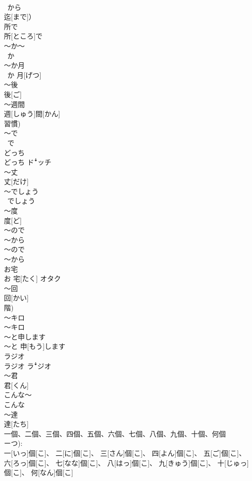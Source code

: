 \documentclass[8pt]{extreport}
\begin{document}
\begin{CJK}{UTF8}{min}
\\	~から　
\\	迄[まで]）	
\\	所で	
\\	所[ところ]で	
\\	～か～	
\\	~か~	
\\	～か月	
\\	~か 月[げつ]	
\\	～後	
\\	後[ご]	
\\	～週間	
\\	週[しゅう]間[かん] 
\\	習慣)	
\\	～で	
\\	~で	
\\	どっち	
\\	どっち	ドꜜッチ
\\	～丈	
\\	丈[だけ]	
\\	～でしょう	
\\	~でしょう	
\\	～度	
\\	度[ど]	
\\	～ので 
\\	～から	
\\	～ので 
\\	～から	
\\	お宅	
\\	お 宅[たく]	オタク
\\	～回	
\\	回[かい] 
\\	階)	
\\	～キロ	
\\	～キロ	
\\	～と申します	
\\	～と 申[もう]します	
\\	ラジオ	
\\	ラジオ	ラꜜジオ
\\	～君	
\\	君[くん]	
\\	こんな～	
\\	こんな~	
\\	～達	
\\	達[たち]	
\\	一個、二個、三個、四個、五個、六個、七個、八個、九個、十個、何個	
\\	ーつ): 
\\	一[いっ]個[こ]、 二[に]個[こ]、 三[さん]個[こ]、 四[よん]個[こ]、 五[ご]個[こ]、 六[ろっ]個[こ]、 七[なな]個[こ]、 八[はっ]個[こ]、 九[きゅう]個[こ]、 十[じゅっ]個[こ]、 何[なん]個[こ]	

\end{CJK}
\end{document}
